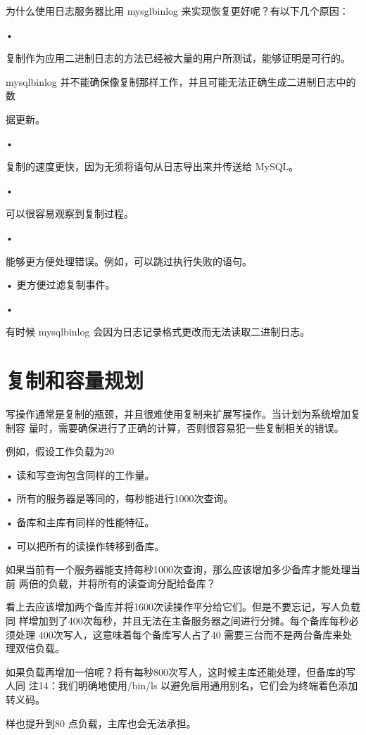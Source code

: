为什么使用日志服务器比用 mysglbinlog 来实现恢复更好呢？有以下几个原因：

•

复制作为应用二进制日志的方法已经被大量的用户所测试，能够证明是可行的。

mysqlbinlog 并不能确保像复制那样工作，并且可能无法正确生成二进制日志中的数

据更新。

•

复制的速度更快，因为无须将语句从日志导出来并传送给 MySQL。

•

可以很容易观察到复制过程。

•

能够更方便处理错误。例如，可以跳过执行失败的语句。

• 更方便过滤复制事件。

•

有时候 mysqlbinlog 会因为日志记录格式更改而无法读取二进制日志。

\section{复制和容量规划}
写操作通常是复制的瓶颈，并且很难使用复制来扩展写操作。当计划为系统增加复制容
量时，需要确保进行了正确的计算，否则很容易犯一些复制相关的错误。

例如，假设工作负载为20%

• 读和写查询包含同样的工作量。

• 所有的服务器是等同的，每秒能进行1000次查询。

• 备库和主库有同样的性能特征。

• 可以把所有的读操作转移到备库。

如果当前有一个服务器能支持每秒1000次查询，那么应该增加多少备库才能处理当前
两倍的负载，并将所有的读查询分配给备库？

看上去应该增加两个备库并将1600次读操作平分给它们。但是不要忘记，写人负载同
样增加到了400次每秒，并且无法在主备服务器之间进行分摊。每个备库每秒必须处理
400次写人，这意味着每个备库写人占了40%
需要三台而不是两台备库来处理双倍负载。

如果负载再增加一倍呢？将有每秒800次写人，这时候主库还能处理，但备库的写人同
注14：我们明确地使用/bin/ls 以避免启用通用别名，它们会为终端着色添加转义码。

样也提升到80%
点负载，主库也会无法承担。

